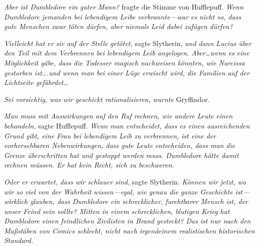\emph{Aber \emph{ist} Dumbledore ein guter Mann?} fragte die Stimme von Hufflepuff. \emph{Wenn Dumbledore jemanden bei lebendigem Leibe verbrannte—war es nicht so, dass gute Menschen zwar töten dürfen, aber niemals Leid dabei zufügen dürfen?}

\emph{Vielleicht hat er sie auf der Stelle getötet,} sagte Slytherin, \emph{und dann Lucius über den Teil mit dem Verbrennen bei lebendigem Leib angelogen. Aber…wenn es eine Möglichkeit gäbe, dass die Todesser magisch nachweisen könnten, wie Narcissa gestorben ist….und wenn man bei einer Lüge erwischt wird, die Familien auf der Lichtseite gefährdet…}

\emph{Sei vorsichtig, was wir geschickt rationalisieren, warnte} Gryffindor.

\emph{Man muss mit Auswirkungen auf den Ruf rechnen, wie andere Leute einen behandeln,} sagte Hufflepuff. \emph{Wenn man entscheidet, dass es einen ausreichenden Grund gibt, eine Frau bei lebendigem Leib zu verbrennen, ist eine der vorhersehbaren Nebenwirkungen, dass gute Leute entscheiden, dass man die Grenze überschritten hat und gestoppt werden muss. Dumbledore hätte damit rechnen müssen. Er hat kein Recht, sich zu beschweren.}

\emph{Oder er erwartet, dass wir schlauer sind,} sagte Slytherin. \emph{Können wir jetzt, wo wir so viel von der Wahrheit wissen—egal, wie genau die ganze Geschichte ist—wirklich glauben, dass Dumbledore ein schrecklicher, furchtbarer Mensch ist, der unser Feind sein sollte? Mitten in einem schrecklichen, blutigen Krieg hat Dumbledore einen} \emph{feindlichen Zivilisten in Brand gesteckt? Das ist nur nach den Maßstäben von Comics schlecht, nicht nach irgendeinem realistischen historischen Standard.}

